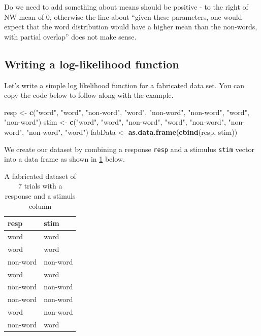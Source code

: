 \documentclass[]{book}
\newenvironment{Shaded}{\begin{snugshade}}{\end{snugshade}}
\newcommand{\KeywordTok}[1]{\textcolor[rgb]{0.13,0.29,0.53}{\textbf{#1}}}
\newcommand{\NormalTok}[1]{#1}
\newcommand{\StringTok}[1]{\textcolor[rgb]{0.31,0.60,0.02}{#1}}
\begin{document}
 Do we need to add something about means should be positive - to the right of NW mean of 0, otherwise the line about ``given these parameters, one would expect that the word distribution would have a higher mean than the non-words, with partial overlap'' does not make sense.

\hypertarget{writing-a-log-likelihood-function}{%
\subsection{Writing a log-likelihood function}\label{writing-a-log-likelihood-function}}

Let's write a simple log likelihood function for a fabricated data set. You can copy the code below to follow along with the example.

\begin{Shaded}
\begin{Highlighting}[]
\NormalTok{resp <-}\StringTok{ }\KeywordTok{c}\NormalTok{(}\StringTok{"word"}\NormalTok{, }\StringTok{"word"}\NormalTok{, }\StringTok{"non-word"}\NormalTok{, }\StringTok{"word"}\NormalTok{, }\StringTok{"non-word"}\NormalTok{, }\StringTok{"non-word"}\NormalTok{, }\StringTok{"word"}\NormalTok{, }\StringTok{"non-word"}\NormalTok{)}
\NormalTok{stim <-}\StringTok{ }\KeywordTok{c}\NormalTok{(}\StringTok{"word"}\NormalTok{, }\StringTok{"word"}\NormalTok{, }\StringTok{"non-word"}\NormalTok{, }\StringTok{"word"}\NormalTok{, }\StringTok{"non-word"}\NormalTok{, }\StringTok{"non-word"}\NormalTok{, }\StringTok{"non-word"}\NormalTok{, }\StringTok{"word"}\NormalTok{)}
\NormalTok{fabData <-}\StringTok{ }\KeywordTok{as.data.frame}\NormalTok{(}\KeywordTok{cbind}\NormalTok{(resp, stim))}
\end{Highlighting}
\end{Shaded}

We create our dataset by combining a response \texttt{resp} and a stimulus \texttt{stim} vector into a data frame as shown in \ref{tab:fakeHead} below.

\begin{table}

\caption{\label{tab:fakeHead}A fabricated dataset of 7 trials with a response and a stimuls column}
\centering
\begin{tabular}[t]{l|l}
\hline
resp & stim\\
\hline
word & word\\
\hline
word & word\\
\hline
non-word & non-word\\
\hline
word & word\\
\hline
non-word & non-word\\
\hline
non-word & non-word\\
\hline
word & non-word\\
\hline
non-word & word\\
\hline
\end{tabular}
\end{table}
\end{document}
